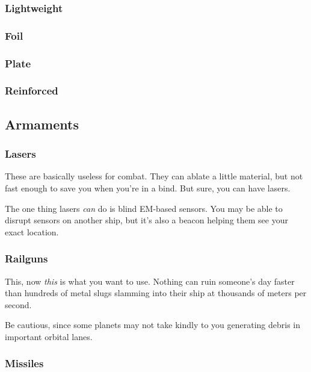 \subsubsection{Lightweight}

\subsubsection{Foil}

\subsubsection{Plate}

\subsubsection{Reinforced}

\subsection{Armaments}

\subsubsection{Lasers}
\par
These are basically useless for combat. They can ablate a little material, but not fast enough to save you when you're in a bind. But sure, you can have lasers.

\par
The one thing lasers \textit{can} do is blind EM-based sensors. You may be able to disrupt sensors on another ship, but it's also a beacon helping them see your exact location.


\subsubsection{Railguns}
\par
This, now \textit{this} is what you want to use. Nothing can ruin someone's day faster than hundreds of metal slugs slamming into their ship at thousands of meters per second.

\par
Be cautious, since some planets may not take kindly to you generating debris in important orbital lanes.


\subsubsection{Missiles}

